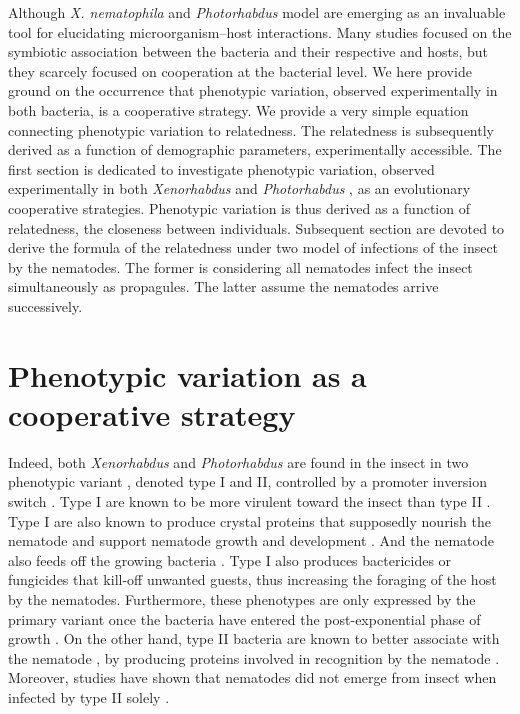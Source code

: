 \documentclass[10pt]{article}
\newcommand{\Xnema}{\textit{X. nematophila} }
\newcommand{\Xeno}{\textit{Xenorhabdus} }
\newcommand{\Photo}{\textit{Photorhabdus} }
\begin{document}
\begin{multicols}{2}
Although \Xnema and \Photo model are emerging as an invaluable tool for elucidating microorganism–host interactions. 
Many studies focused on the symbiotic association between the bacteria and their respective and hosts, but they scarcely focused on cooperation at the bacterial level. 
We here provide ground on the occurrence that phenotypic variation, observed experimentally in both bacteria, is a cooperative strategy. 
We provide a very simple equation connecting phenotypic variation to relatedness. 
The relatedness is subsequently derived as a function of demographic parameters, experimentally accessible.
The first section is dedicated to investigate phenotypic variation, observed experimentally in both \Xeno and \Photo, as an evolutionary cooperative strategies. 
Phenotypic variation is thus derived as a function of relatedness, the closeness between individuals. 
Subsequent section are devoted to derive the formula of the relatedness under two  model of infections of the insect by the nematodes. 
The former is considering all nematodes infect the insect simultaneously as propagules. 
The latter assume the nematodes arrive successively.


\section*{Phenotypic variation as a cooperative strategy}

Indeed, both \Xeno and \Photo are found in the insect in two phenotypic variant \cite{Akhurst1982a,Forst1997}, denoted type I and II, controlled by a promoter inversion switch \cite{Somvanshi2012}. 
Type I are known to be more virulent toward the insect than type II \cite{Volgyi,Givaudan2000}. 
Type I are also known to produce crystal proteins \cite{Ciche2006,bintrim1998insertional} that supposedly nourish the nematode and support nematode growth and development \cite{Somvanshi2012}. 
And the nematode also feeds off the growing bacteria \cite{Waterfield2009}.  
Type I also produces bactericides \cite{Ji2004,Gualtieri2009} or fungicides that kill-off unwanted guests, thus increasing the foraging of the host by the nematodes. 
Furthermore, these phenotypes are only expressed by the primary variant once the bacteria have entered the post-exponential phase of growth \cite{clarke1995virulence}.
On the other hand, type II bacteria are known to better associate with the nematode \cite{sicard2005effect}, by producing proteins involved in recognition by the nematode \cite{Somvanshi2010,Heungens2002}. 
Moreover, studies have shown that nematodes did not emerge from insect when infected by type II solely \cite{Sugar2012}. 


\end{multicols}
\end{document}
